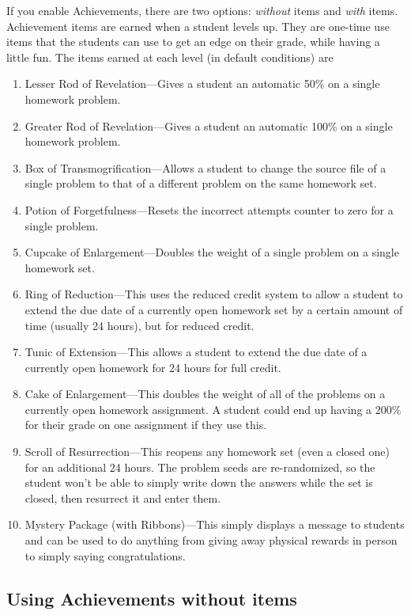 \documentclass[12pt]{article}
\begin{document}
If you enable Achievements, there are two options: \emph{without} items and \emph{with} items. Achievement items are earned when a student levels up. They are one-time use  items that the students can use to get an edge on their grade, while having a little fun. The items earned at each level (in default conditions) are
\begin{enumerate}
\item Lesser Rod of Revelation---Gives a student an automatic 50\% on a single homework problem.
\item Greater Rod of Revelation---Gives a student an automatic 100\% on a single homework problem.
\item Box of Transmogrification---Allows a student to change the source file of a single problem to that of a different problem on the same homework set.
\item Potion of Forgetfulness---Resets the incorrect attempts counter to zero for a single problem.
\item Cupcake of Enlargement---Doubles the weight of a single problem on a single homework set.
\item Ring of Reduction---This uses the reduced credit system to allow a student to extend the due date of a currently open homework set by a certain amount of time (usually 24 hours), but for reduced credit.
\item Tunic of Extension---This allows a student to extend the due date of a currently open homework for 24 hours for full credit.
\item Cake of Enlargement---This doubles the weight of all of the problems on a currently open homework assignment. A student could end up having a 200\% for their grade on one assignment if they use this.
\item Scroll of Resurrection---This reopens any homework set (even a closed one) for an additional 24 hours. The problem seeds are re-randomized, so the student won't be able to simply write down the answers while the set is closed, then resurrect it and enter them.
\item Mystery Package (with Ribbons)---This simply displays a message to students and can be used to do anything from giving away physical rewards in person to simply saying congratulations.
\end{enumerate}

\subsection{Using Achievements without items}
\end{document}
